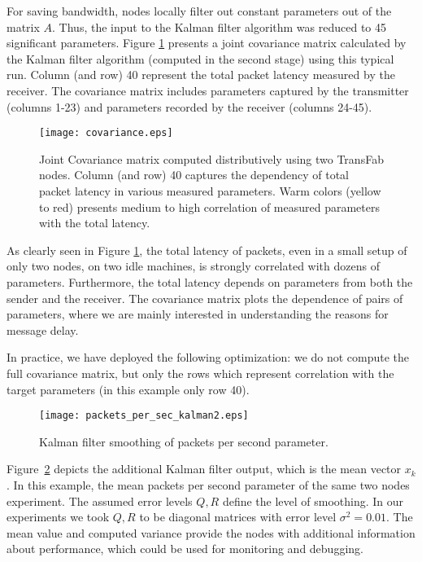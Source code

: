 \documentclass[times, 10pt,twocolumn]{article}
\begin{document}
For saving bandwidth, nodes locally filter out constant parameters out of the matrix $A$. Thus, the input
to the Kalman filter algorithm was reduced to 45 significant parameters. Figure \ref{covariance2} presents a joint covariance matrix calculated by the Kalman filter algorithm (computed in the second stage) using this
typical run. Column (and row) 40 represent the total packet latency measured by the receiver. The covariance matrix includes parameters captured by the transmitter (columns 1-23) and parameters recorded by the receiver (columns 24-45).
\begin{figure}[ht!]
\hspace{-1cm}
\texttt{[image: covariance.eps]}\\
  \caption{Joint Covariance matrix computed distributively using two TransFab nodes. Column (and row) 40 captures the dependency of total packet latency in various measured parameters. Warm colors (yellow to red) presents medium to high correlation of measured parameters with the total latency.}\label{covariance2}
\end{figure}

As clearly seen in Figure \ref{covariance2}, the total
latency of packets, even in a small setup of only two nodes,
on two idle machines, is strongly correlated with dozens of
parameters. Furthermore, the total latency depends on
parameters from both the sender and the receiver.
The covariance matrix plots the dependence of pairs of
parameters, where we are mainly interested in understanding
the reasons for message delay. 

In practice, we have deployed
the following optimization: we do not compute the full covariance matrix, but only the rows which represent correlation with the target parameters (in this example only row 40). 

\begin{figure}[ht!]
\begin{center}
\texttt{[image: packets\_per\_sec\_kalman2.eps]}\\
  \caption{Kalman filter smoothing of packets per second parameter.}\label{fig:packets_per_sec_kalman}
\end{center}
\end{figure}

Figure~\ref{fig:packets_per_sec_kalman} depicts the additional Kalman filter output, which is the mean vector $x_k$.
In this example, the mean packets per second parameter of the same two nodes experiment.
The assumed error levels $Q,R$ define the level of smoothing. In our experiments we took $Q,R$ to be diagonal matrices with error level $\sigma^2 = 0.01$. The mean value and computed variance provide the nodes with additional
information about performance, which could be used for monitoring and debugging.
\end{document}
